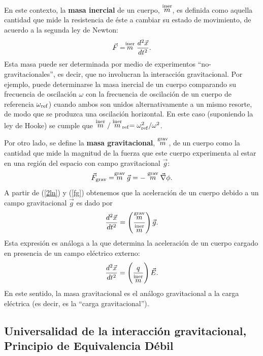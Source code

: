 En este contexto, la \textbf{masa inercial} de un cuerpo, $\stackrel{\rm iner}{m}$, es definida como aquella cantidad que mide la resistencia de éste a cambiar su estado de movimiento, de acuerdo a la segunda ley de Newton:
\begin{equation}\label{2ln}
\vec{F}=\stackrel{\rm iner}{m}\frac{d^2\vec{x}}{dt^2}.
\end{equation}
Esta masa puede ser determinada por medio de experimentos ``no-gravitacionales'', es decir, que no involucran la interacción gravitacional. Por ejemplo, puede determinarse la masa inercial de un cuerpo comparando su frecuencia de oscilación $\omega$ con la frecuencia de oscilación de un cuerpo de referencia $\omega_{\rm ref}$) cuando ambos son unidos alternativamente a un mismo resorte, de modo que se produzca una oscilación horizontal. En este caso (suponiendo la ley de Hooke) se cumple que $\stackrel{\rm iner}{m}/\stackrel{\rm iner}{m}_{\rm ref}=\omega_{\rm ref}^2/\omega^2$.

Por otro lado, se define la \textbf{masa gravitacional}, $\stackrel{\rm grav}{m}$, de un cuerpo como la cantidad que mide la magnitud de la fuerza que este cuerpo experimenta al estar en una región del espacio con campo gravitacional $\vec{g}$:
\begin{equation}\label{fg}
\vec{F}_{\rm grav}=\stackrel{\rm grav}{m}\vec{g}=-\stackrel{\rm grav}{m}\vec\nabla\phi.
\end{equation}
A partir de (\ref{2ln}) y (\ref{fg}) obtenemos que la aceleración de un cuerpo debido a un campo gravitacional $\vec{g}$ es dado por
\begin{equation}\label{amimg}
\frac{d^2\vec{x}}{dt^2}=\left(\frac{\stackrel{\rm grav}{m}}{\stackrel{\rm iner}{m}}\right)\vec{g}.
\end{equation}
Esta expresión es análoga a la que determina la aceleración de un cuerpo cargado en presencia de un campo eléctrico externo:
\begin{equation}\label{aqE}
\frac{d^2\vec{x}}{dt^2}=\left(\frac{q}{\stackrel{\rm iner}{m}}\right)\vec{E}.
\end{equation}
En este sentido, la masa gravitacional es el análogo gravitacional a la carga eléctrica (es decir, es la ``carga gravitacional'').


\subsection{Universalidad de la interacción gravitacional, Principio de Equivalencia Débil}

